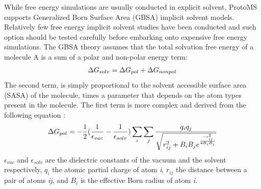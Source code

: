 \documentclass[letterpaper,10pt,english]{sphinxmanual}
\begin{document}
While free energy simulations are usually conducted in explicit solvent, ProtoMS supports Generalized Born Surface Area (GBSA) implicit solvent models. Relatively few free energy implicit solvent studies have been conducted and such option should be tested carefully before embarking onto expensive free energy simulations. The GBSA theory assumes that the total solvation free energy of a molecule A is a sum of a polar and non-polar energy term:
\begin{gather}
\begin{split}\Delta G_{solv} = \Delta G_{pol} + \Delta G_{nonpol}\end{split}\notag
\end{gather}
The second term, is simply proportional to the solvent accessible surface area (SASA) of the molecule, times a parameter that depends on the atom types present in the molecule. The first term is more complex and derived from the following equation :
\begin{gather}
\begin{split}\Delta G_{pol} = -\frac{1}{2}(\frac{1}{\epsilon_{vac}}-\frac{1}{\epsilon_{solv}})  \sum_{i}\sum_{j} \frac{q_{i}q_{j}}{\sqrt{r^{2}_{ij} + B_{i}B_{j} e^{\frac{-r^{2}_{ij}}{4B_{i}B_{j}}}   } }\end{split}\notag
\end{gather}
\(\epsilon_{vac}\) and \(\epsilon_{solv}\) are the dielectric constants of the vacuum and the solvent respectively, \(q_{i}\) the atomic partial charge of atom \emph{i}, \(r_{ij}\) the distance between a pair of atoms \emph{ij}, and \(B_{i}\) is the effective Born radius of atom \emph{i}.
\end{document}
